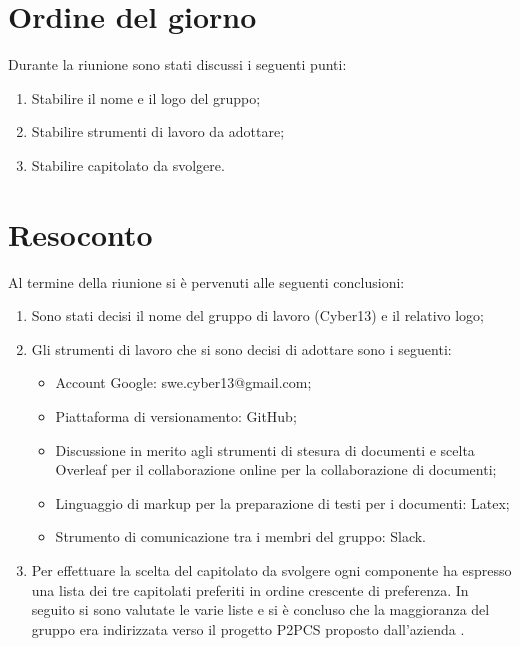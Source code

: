 \documentclass[a4paper, 12pt]{article}
\begin{document}
	
	
	
\newpage
\section{Ordine del giorno}
Durante la riunione sono stati discussi i seguenti punti:
\begin{enumerate}
	\item Stabilire il nome e il logo del gruppo;
	\item Stabilire strumenti di lavoro da adottare;
	\item Stabilire capitolato da svolgere.
\end{enumerate}
	

\newpage
\section{Resoconto}
Al termine della riunione si è pervenuti alle seguenti conclusioni:	
\begin{enumerate}
	\item Sono stati decisi il nome del gruppo di lavoro (Cyber13) e il relativo logo;
	\item Gli strumenti di lavoro che si sono decisi di adottare sono i seguenti:
		\begin{itemize}
			\item Account Google: swe.cyber13@gmail.com;
			\item Piattaforma di versionamento: GitHub;
			\item Discussione in merito agli strumenti di stesura di documenti e scelta Overleaf per il collaborazione online per la collaborazione di documenti;
			\item Linguaggio di markup per la preparazione di testi per i documenti: Latex;
			\item Strumento di comunicazione tra i membri del gruppo: Slack.
		\end{itemize}
	\item Per effettuare la scelta del capitolato da svolgere ogni componente ha espresso una lista dei tre capitolati preferiti in ordine crescente di preferenza. In seguito si sono valutate le varie liste e si è concluso che la maggioranza del gruppo era indirizzata verso il progetto P2PCS proposto dall'azienda . 
\end{enumerate}
\newpage
\end{document}
